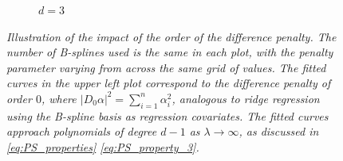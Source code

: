 \begin{figure}[H]
\begin{subfigure}{.5\textwidth}
\caption{$d=3$}
\end{subfigure}
\caption{\textit{Illustration of the impact of the order of the difference penalty. The number of B-splines used is the same in each plot, with the penalty parameter varying from across the same grid of values. The fitted curves in the upper left plot correspond to the difference penalty of order $0$, where $\vert D_0 \alpha \vert^2 = \sum_{i=1}^n \alpha_i^2$, analogous to ridge regression using the B-spline basis as regression covariates. The fitted curves approach polynomials of degree $d-1$ as $\lambda \rightarrow \infty$, as discussed in \ref{eq:PS_properties} \ref{eq:PS_property_3}.}}
\label{fig:PS_penalty_section_figure_6}
\end{figure}






